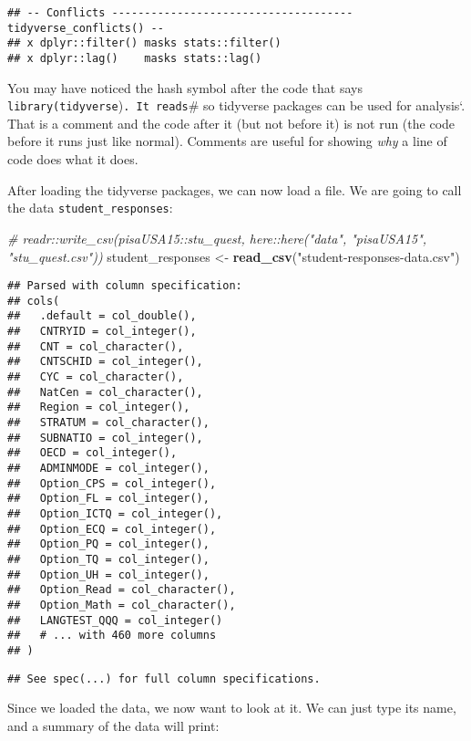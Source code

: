 \documentclass[]{article}
\newenvironment{Shaded}{\begin{snugshade}}{\end{snugshade}}
\newcommand{\KeywordTok}[1]{\textcolor[rgb]{0.13,0.29,0.53}{\textbf{#1}}}
\newcommand{\StringTok}[1]{\textcolor[rgb]{0.31,0.60,0.02}{#1}}
\newcommand{\CommentTok}[1]{\textcolor[rgb]{0.56,0.35,0.01}{\textit{#1}}}
\newcommand{\NormalTok}[1]{#1}
\begin{document}
\begin{verbatim}
## -- Conflicts ------------------------------------- tidyverse_conflicts() --
## x dplyr::filter() masks stats::filter()
## x dplyr::lag()    masks stats::lag()
\end{verbatim}

You may have noticed the hash symbol after the code that says
\texttt{library(tidyverse})\texttt{.\ It\ reads}\# so tidyverse packages
can be used for analysis`. That is a comment and the code after it (but
not before it) is not run (the code before it runs just like normal).
Comments are useful for showing \emph{why} a line of code does what it
does.

After loading the tidyverse packages, we can now load a file. We are
going to call the data \texttt{student\_responses}:

\begin{Shaded}
\begin{Highlighting}[]
\CommentTok{# readr::write_csv(pisaUSA15::stu_quest, here::here("data", "pisaUSA15", "stu_quest.csv"))}
\NormalTok{student_responses <-}\StringTok{ }\KeywordTok{read_csv}\NormalTok{(}\StringTok{"student-responses-data.csv"}\NormalTok{)}
\end{Highlighting}
\end{Shaded}

\begin{verbatim}
## Parsed with column specification:
## cols(
##   .default = col_double(),
##   CNTRYID = col_integer(),
##   CNT = col_character(),
##   CNTSCHID = col_integer(),
##   CYC = col_character(),
##   NatCen = col_character(),
##   Region = col_integer(),
##   STRATUM = col_character(),
##   SUBNATIO = col_integer(),
##   OECD = col_integer(),
##   ADMINMODE = col_integer(),
##   Option_CPS = col_integer(),
##   Option_FL = col_integer(),
##   Option_ICTQ = col_integer(),
##   Option_ECQ = col_integer(),
##   Option_PQ = col_integer(),
##   Option_TQ = col_integer(),
##   Option_UH = col_integer(),
##   Option_Read = col_character(),
##   Option_Math = col_character(),
##   LANGTEST_QQQ = col_integer()
##   # ... with 460 more columns
## )
\end{verbatim}

\begin{verbatim}
## See spec(...) for full column specifications.
\end{verbatim}

Since we loaded the data, we now want to look at it. We can just type
its name, and a summary of the data will print:
\end{document}
